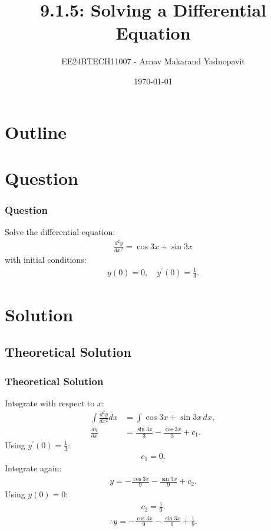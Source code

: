 \documentclass{beamer}
\title{9.1.5: Solving a Differential Equation}
\author{EE24BTECH11007 - Arnav Makarand Yadnopavit}
\date{\today}
\numberwithin{equation}{section}
\begin{document}
\begin{frame}
\titlepage
\end{frame}

\section*{Outline}
\begin{frame}
\tableofcontents
\end{frame}

\section{Question}
\begin{frame}
\frametitle{Question}
Solve the differential equation:
\begin{align}
\frac{d^2y}{dx^2} = \cos3x + \sin3x
\end{align}
with initial conditions:
\begin{align}
y(0) = 0, \quad y^\prime(0) = \frac{1}{3}.
\end{align}
\end{frame}

\section{Solution}
\subsection{Theoretical Solution}
\begin{frame}
\frametitle{Theoretical Solution}
Integrate with respect to \(x\):
\begin{align}
    \int \frac{d^2y}{dx^2} dx &= \int \cos3x + \sin3x \, dx, \\
    \frac{dy}{dx} &= \frac{\sin3x}{3} - \frac{\cos3x}{3} + c_1.
\end{align}
Using \(y^\prime(0) = \frac{1}{3}\):
\begin{align}
c_1 = 0.
\end{align}
Integrate again:
\begin{align}
y = -\frac{\cos3x}{9} - \frac{\sin3x}{9} + c_2.
\end{align}
Using $y(0) = 0$:
\begin{align}
c_2 = \frac{1}{9}.
\end{align}
\begin{align}
\therefore y = -\frac{\cos3x}{9} - \frac{\sin3x}{9} + \frac{1}{9}.
\end{align}
\end{frame}
\end{document}
